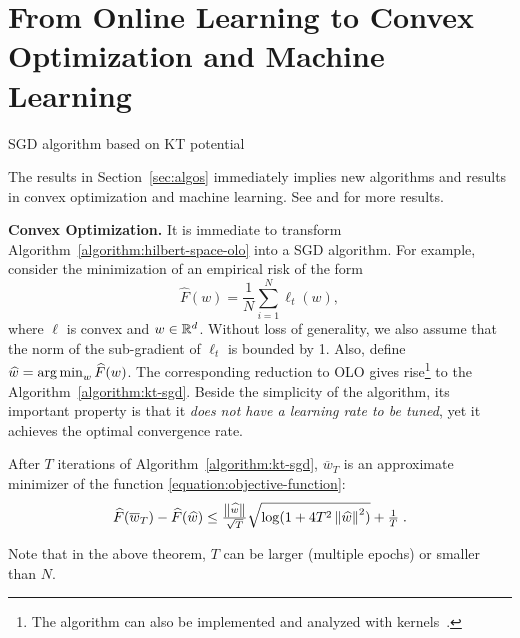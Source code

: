 \section{From Online Learning to Convex Optimization and Machine Learning}
\label{section:applications}

\begin{algorithm}[t]
\caption{SGD algorithm based on KT potential \label{algorithm:kt-sgd}}
\begin{algorithmic}[1]
{
\ENDFOR
{}
}
\end{algorithmic}
\end{algorithm}

The results in Section~\ref{sec:algos} immediately implies new algorithms and
results in convex optimization and machine learning. See \cite{Orabona-2014} and \cite{Luo-Schapire-2015} for more results.

\textbf{Convex Optimization.} It is immediate to transform
Algorithm~\ref{algorithm:hilbert-space-olo} into a \ac{SGD} algorithm.  For
example, consider the minimization of an empirical risk of the
form
%
\begin{equation}
\label{equation:objective-function}
\widehat{F}(w) = \frac{1}{N} \sum_{i=1}^N \ell_t(w),
\end{equation}
%
where $\ell$ is convex and $w \in \mathbb{R}^d$. Without loss of generality, we also
assume that the norm of the sub-gradient of $\ell_t$ is bounded by 1. Also,
define $\widehat{w}=  \operatorname*{arg\,min}_w \widehat{F}(w)$.  The corresponding reduction to OLO
gives rise\footnote{The algorithm can also be implemented and analyzed with kernels~\citep{Orabona-2014}.}
to the Algorithm~\ref{algorithm:kt-sgd}.
Beside the simplicity of the algorithm, its important property is that it
\emph{does not have a learning rate to be tuned}, yet it achieves the optimal
convergence rate.
%
\begin{theorem}
After $T$ iterations of Algorithm~\ref{algorithm:kt-sgd}, $\overline{w}_T$ is
an approximate minimizer of the function \eqref{equation:objective-function}:
\[
\widehat{F}(\overline{w}_T) - \widehat{F}(\widehat{w}) \leq \tfrac{\left\|{\widehat{w}}\right\|}{\sqrt{T}} \sqrt{\log(1+4 T^2 \left\|{\widehat{w}}\right\|^2)} +\tfrac{1}{T} \; .
\]
\end{theorem}
%
Note that in the above theorem, $T$ can be larger (multiple epochs) or smaller
than $N$.

